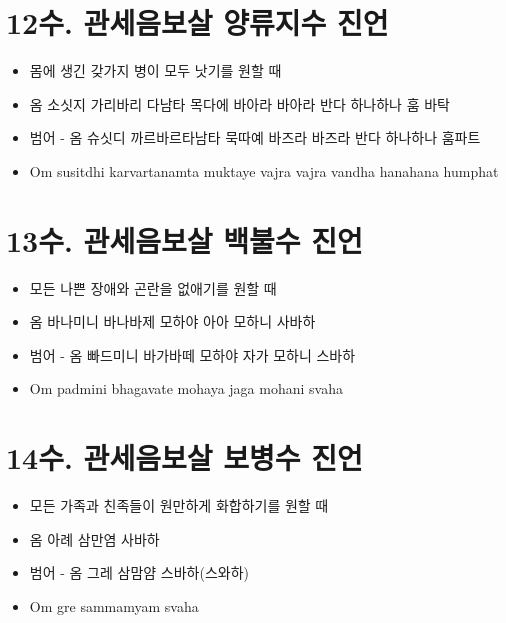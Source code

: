 \documentclass[12pt, a4paper, oneside]{book}
\let\stdsection\section
\renewcommand\section{\newpage\stdsection}
\begin{document}
\section{12수. 관세음보살 양류지수 진언}

			\begin{itemize}
			\item 몸에 생긴 갖가지 병이 모두 낫기를 원할 때
			\item 옴 소싯지 가리바리 다남타 목다에 바아라 바아라 반다 하나하나 훔 바탁
			\item 범어 - 옴 슈싯디 까르바르타남타 묵따예 바즈라 바즈라 반다 하나하나 훔파트
			\item Om susitdhi karvartanamta muktaye vajra vajra vandha hanahana humphat
			\end{itemize}





\section{13수. 관세음보살 백불수 진언}

			\begin{itemize}
			\item 모든 나쁜 장애와 곤란을 없애기를 원할 때
			\item 옴 바나미니 바나바제 모하야 아아 모하니 사바하
			\item 범어 - 옴 빠드미니 바가바떼 모하야 자가 모하니 스바하
			\item Om padmini bhagavate mohaya jaga mohani svaha
			\end{itemize}





\section{14수. 관세음보살 보병수 진언}

			\begin{itemize}
			\item 모든 가족과 친족들이 원만하게 화합하기를 원할 때
			\item 옴 아례 삼만염 사바하
			\item 범어 - 옴 그레 삼맘얌 스바하(스와하)
			\item Om gre sammamyam svaha
			\end{itemize}
\end{document}
